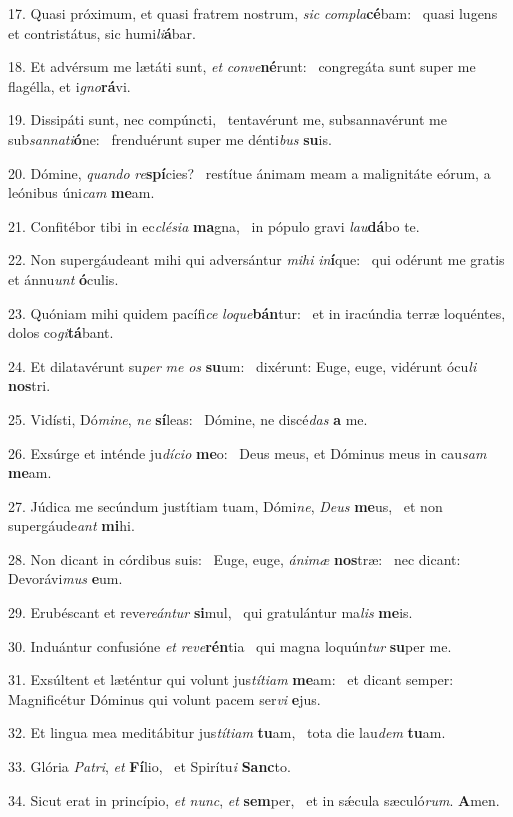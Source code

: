 17. Quasi próximum, et quasi fratrem nostrum, \textit{sic} \textit{com}\textit{pla}\textbf{cé}bam: \ast\  quasi lugens et contristátus, sic humi\textit{li}\textbf{á}bar.\

18. Et advérsum me lætáti sunt, \textit{et} \textit{con}\textit{ve}\textbf{né}runt: \ast\  congregáta sunt super me flagélla, et i\textit{gno}\textbf{rá}vi.\

19. Dissipáti sunt, nec compúncti, \dag\  tentavérunt me, subsannavérunt me sub\textit{san}\textit{na}\textit{ti}\textbf{ó}ne: \ast\  frenduérunt super me dénti\textit{bus} \textbf{su}is.\

20. Dómine, \textit{quan}\textit{do} \textit{re}\textbf{spí}cies? \ast\  restítue ánimam meam a malignitáte eórum, a leónibus úni\textit{cam} \textbf{me}am.\

21. Confitébor tibi in ec\textit{clé}\textit{si}\textit{a} \textbf{ma}gna, \ast\  in pópulo gravi \textit{lau}\textbf{dá}bo te.\

22. Non supergáudeant mihi qui adversántur \textit{mi}\textit{hi} \textit{in}\textbf{í}que: \ast\  qui odérunt me gratis et ánnu\textit{unt} \textbf{ó}culis.\

23. Quóniam mihi quidem pacífi\textit{ce} \textit{lo}\textit{que}\textbf{bán}tur: \ast\  et in iracúndia terræ loquéntes, dolos co\textit{gi}\textbf{tá}bant.\

24. Et dilatavérunt su\textit{per} \textit{me} \textit{os} \textbf{su}um: \ast\  dixérunt: Euge, euge, vidérunt ócu\textit{li} \textbf{nos}tri.\

25. Vidísti, Dó\textit{mi}\textit{ne}, \textit{ne} \textbf{sí}leas: \ast\  Dómine, ne discé\textit{das} \textbf{a} me.\

26. Exsúrge et inténde ju\textit{dí}\textit{ci}\textit{o} \textbf{me}o: \ast\  Deus meus, et Dóminus meus in cau\textit{sam} \textbf{me}am.\

27. Júdica me secúndum justítiam tuam, Dómi\textit{ne}, \textit{De}\textit{us} \textbf{me}us, \ast\  et non supergáude\textit{ant} \textbf{mi}hi.\

28. Non dicant in córdibus suis: \dag\  Euge, euge, \textit{á}\textit{ni}\textit{mæ} \textbf{nos}træ: \ast\  nec dicant: Devorávi\textit{mus} \textbf{e}um.\

29. Erubéscant et reve\textit{re}\textit{án}\textit{tur} \textbf{si}mul, \ast\  qui gratulántur ma\textit{lis} \textbf{me}is.\

30. Induántur confusióne \textit{et} \textit{re}\textit{ve}\textbf{rén}tia \ast\  qui magna loquún\textit{tur} \textbf{su}per me.\

31. Exsúltent et læténtur qui volunt jus\textit{tí}\textit{ti}\textit{am} \textbf{me}am: \ast\  et dicant semper: Magnificétur Dóminus qui volunt pacem ser\textit{vi} \textbf{e}jus.\

32. Et lingua mea meditábitur jus\textit{tí}\textit{ti}\textit{am} \textbf{tu}am, \ast\  tota die lau\textit{dem} \textbf{tu}am.\

33. Glória \textit{Pa}\textit{tri}, \textit{et} \textbf{Fí}lio, \ast\  et Spirítu\textit{i} \textbf{Sanc}to.\

34. Sicut erat in princípio, \textit{et} \textit{nunc}, \textit{et} \textbf{sem}per, \ast\  et in sǽcula sæculó\textit{rum}. \textbf{A}men.\

